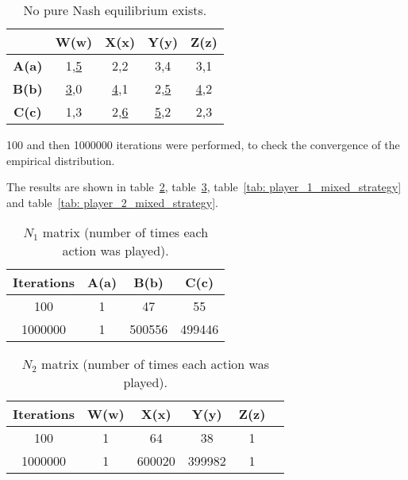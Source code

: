 \begin{table}[H]
    \centering
    \begin{tabular}{|c|c|c|c|c|}
        \cline{2-5}
        \multicolumn{1}{c|}{} & \textbf{W(w)} & \textbf{X(x)} & \textbf{Y(y)} & \textbf{Z(z)} \\
        \hline
        \textbf{A(a)} & 1,\underline{5} & 2,2 & 3,4 & 3,1 \\
        \hline
        \textbf{B(b)} & \underline{3},0 & \underline{4},1 & 2,\underline{5} & \underline{4},2 \\
        \hline
        \textbf{C(c)} & 1,3 & 2,\underline{6} & \underline{5},2 & 2,3 \\
        \hline
    \end{tabular}
    \caption{No pure Nash equilibrium exists.}
    \label{tab: optimal_action}
\end{table}

100 and then 1000000 iterations were performed, to check the convergence of the empirical distribution.

The results are shown in table~\ref{tab: player_1_n_matrix}, table~\ref{tab: player_2_n_matrix}, table~\ref{tab: player_1_mixed_strategy} and table~\ref{tab: player_2_mixed_strategy}.
\begin{table}[H]
    \centering
    \begin{tabular}{|c|c|c|c|}
        \hline
        \textbf{Iterations} & \textbf{A(a)} & \textbf{B(b)} & \textbf{C(c)} \\
        \hline
        100 & 1 & 47 & 55 \\
        \hline
        1000000 & 1 & 500556 & 499446 \\
        \hline
    \end{tabular}
    \caption{$N_1$ matrix (number of times each action was played).}
    \label{tab: player_1_n_matrix}
\end{table}

\begin{table}[H]
    \centering
    \begin{tabular}{|c|c|c|c|c|c|}
        \hline
        \textbf{Iterations}& \textbf{W(w)} & \textbf{X(x)} & \textbf{Y(y)} & \textbf{Z(z)} \\
        \hline
        100 & 1 & 64 & 38 & 1 \\
        \hline
        1000000 & 1 & 600020 & 399982 & 1 \\
        \hline
    \end{tabular}
    \caption{$N_2$ matrix (number of times each action was played).}
    \label{tab: player_2_n_matrix}
\end{table}


